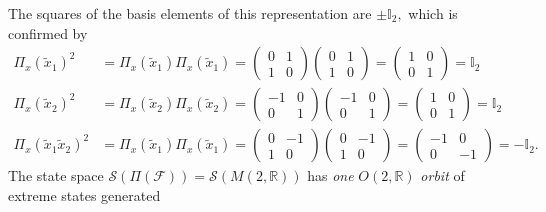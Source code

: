 \documentclass[aps,preprint]{revtex4}
\begin{document}
The squares of the basis elements of this representation are $\pm \mathbb{I}%
_{2},$ which is confirmed by 
\begin{align}
\mathcal{\Pi }_{x}\left( \widetilde{x}_{1}\right) ^{2}& =\mathcal{\Pi }%
_{x}\left( \widetilde{x}_{1}\right) \mathcal{\Pi }_{x}\left( \widetilde{x}%
_{1}\right) =\left( 
\begin{array}{cc}
0 & 1 \\ 
1 & 0%
\end{array}%
\right) \left( 
\begin{array}{cc}
0 & 1 \\ 
1 & 0%
\end{array}%
\right) =\left( 
\begin{array}{cc}
1 & 0 \\ 
0 & 1%
\end{array}%
\right) =\mathbb{I}_{2} \\
\mathcal{\Pi }_{x}\left( \widetilde{x}_{2}\right) ^{2}& =\mathcal{\Pi }%
_{x}\left( \widetilde{x}_{2}\right) \mathcal{\Pi }_{x}\left( \widetilde{x}%
_{2}\right) =\left( 
\begin{array}{cc}
-1 & 0 \\ 
0 & 1%
\end{array}%
\right) \left( 
\begin{array}{cc}
-1 & 0 \\ 
0 & 1%
\end{array}%
\right) =\left( 
\begin{array}{cc}
1 & 0 \\ 
0 & 1%
\end{array}%
\right) =\mathbb{I}_{2} \\
\mathcal{\Pi }_{x}\left( \widetilde{x}_{1}\widetilde{x}_{2}\right) ^{2}& =%
\mathcal{\Pi }_{x}\left( \widetilde{x}_{1}\right) \mathcal{\Pi }_{x}\left( 
\widetilde{x}_{1}\right) =\left( 
\begin{array}{cc}
0 & -1 \\ 
1 & 0%
\end{array}%
\right) \left( 
\begin{array}{cc}
0 & -1 \\ 
1 & 0%
\end{array}%
\right) =\left( 
\begin{array}{cc}
-1 & 0 \\ 
0 & -1%
\end{array}%
\right) =-\mathbb{I}_{2}.
\end{align}%
The state space $\mathcal{S}\left( \mathcal{\Pi }\left( \mathcal{F}\right)
\right) =\mathcal{S}\left( M\left( 2,\mathbb{R}\right) \right) $ has \emph{%
one} $O\left( 2,\mathbb{R}\right) $ \emph{orbit} of extreme states generated
\end{document}

